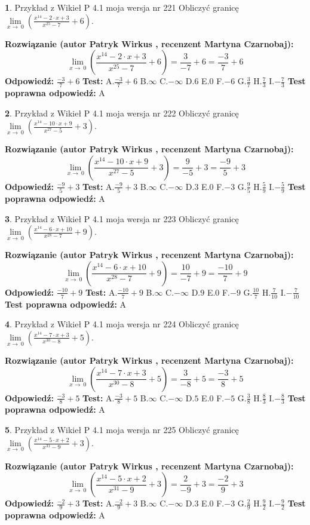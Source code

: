 \documentclass[12pt, a4paper]{article}
\theoremstyle{definition} %
\newtheorem{zad}{}
\newcommand{\zadStart}[1]{\begin{zad}#1\newline}
\newcommand{\zadStop}{\end{zad}}
\newcommand{\rozwStart}[2]{\noindent \textbf{Rozwiązanie (autor #1 , recenzent #2): }\newline}
\newcommand{\rozwStop}{\newline}
\newcommand{\odpStart}{\noindent \textbf{Odpowiedź:}\newline}
\newcommand{\odpStop}{\newline}
\newcommand{\testStart}{\noindent \textbf{Test:}\newline}
\newcommand{\testStop}{\newline}
\newcommand{\kluczStart}{\noindent \textbf{Test poprawna odpowiedź:}\newline}
\newcommand{\kluczStop}{\newline}
\begin{document}
\zadStart{Przykład z Wikieł P 4.1 moja wersja nr 221}
Obliczyć granicę $\lim\limits_{x\to\ 0}(\frac{x^{14}-2 \cdot x +3}{x^{25}-7}+6)$.
\zadStop
\rozwStart{Patryk Wirkus}{Martyna Czarnobaj}
$$\lim\limits_{x\to\ 0}(\frac{x^{14}-2 \cdot x +3}{x^{25}-7}+6)=\frac{3}{-7}+6=\frac{-3}{7}+6$$
\rozwStop
\odpStart
$\frac{-3}{7}+6$
\odpStop
\testStart
A.$\frac{-3}{7}+6$
B.$\infty$
C.$-\infty$
D.$6$
E.$0$
F.$-6$
G.$\frac{3}{7}$
H.$\frac{7}{3}$
I.$-\frac{7}{3}$
\testStop
\kluczStart
A
\kluczStop



\zadStart{Przykład z Wikieł P 4.1 moja wersja nr 222}
Obliczyć granicę $\lim\limits_{x\to\ 0}(\frac{x^{14}-10 \cdot x +9}{x^{27}-5}+3)$.
\zadStop
\rozwStart{Patryk Wirkus}{Martyna Czarnobaj}
$$\lim\limits_{x\to\ 0}(\frac{x^{14}-10 \cdot x +9}{x^{27}-5}+3)=\frac{9}{-5}+3=\frac{-9}{5}+3$$
\rozwStop
\odpStart
$\frac{-9}{5}+3$
\odpStop
\testStart
A.$\frac{-9}{5}+3$
B.$\infty$
C.$-\infty$
D.$3$
E.$0$
F.$-3$
G.$\frac{9}{5}$
H.$\frac{5}{9}$
I.$-\frac{5}{9}$
\testStop
\kluczStart
A
\kluczStop



\zadStart{Przykład z Wikieł P 4.1 moja wersja nr 223}
Obliczyć granicę $\lim\limits_{x\to\ 0}(\frac{x^{14}-6 \cdot x +10}{x^{28}-7}+9)$.
\zadStop
\rozwStart{Patryk Wirkus}{Martyna Czarnobaj}
$$\lim\limits_{x\to\ 0}(\frac{x^{14}-6 \cdot x +10}{x^{28}-7}+9)=\frac{10}{-7}+9=\frac{-10}{7}+9$$
\rozwStop
\odpStart
$\frac{-10}{7}+9$
\odpStop
\testStart
A.$\frac{-10}{7}+9$
B.$\infty$
C.$-\infty$
D.$9$
E.$0$
F.$-9$
G.$\frac{10}{7}$
H.$\frac{7}{10}$
I.$-\frac{7}{10}$
\testStop
\kluczStart
A
\kluczStop



\zadStart{Przykład z Wikieł P 4.1 moja wersja nr 224}
Obliczyć granicę $\lim\limits_{x\to\ 0}(\frac{x^{14}-7 \cdot x +3}{x^{30}-8}+5)$.
\zadStop
\rozwStart{Patryk Wirkus}{Martyna Czarnobaj}
$$\lim\limits_{x\to\ 0}(\frac{x^{14}-7 \cdot x +3}{x^{30}-8}+5)=\frac{3}{-8}+5=\frac{-3}{8}+5$$
\rozwStop
\odpStart
$\frac{-3}{8}+5$
\odpStop
\testStart
A.$\frac{-3}{8}+5$
B.$\infty$
C.$-\infty$
D.$5$
E.$0$
F.$-5$
G.$\frac{3}{8}$
H.$\frac{8}{3}$
I.$-\frac{8}{3}$
\testStop
\kluczStart
A
\kluczStop



\zadStart{Przykład z Wikieł P 4.1 moja wersja nr 225}
Obliczyć granicę $\lim\limits_{x\to\ 0}(\frac{x^{14}-5 \cdot x +2}{x^{31}-9}+3)$.
\zadStop
\rozwStart{Patryk Wirkus}{Martyna Czarnobaj}
$$\lim\limits_{x\to\ 0}(\frac{x^{14}-5 \cdot x +2}{x^{31}-9}+3)=\frac{2}{-9}+3=\frac{-2}{9}+3$$
\rozwStop
\odpStart
$\frac{-2}{9}+3$
\odpStop
\testStart
A.$\frac{-2}{9}+3$
B.$\infty$
C.$-\infty$
D.$3$
E.$0$
F.$-3$
G.$\frac{2}{9}$
H.$\frac{9}{2}$
I.$-\frac{9}{2}$
\testStop
\kluczStart
A
\kluczStop
\end{document}
